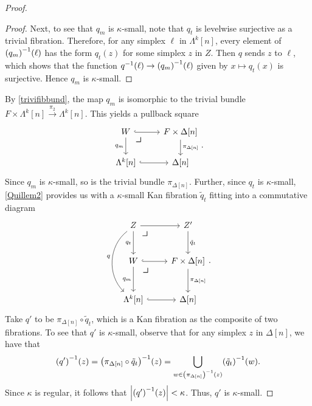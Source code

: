 \documentclass[10pt,letterpaper,cm]{nupset}
\theoremstyle{definition}
\theoremstyle{theorem}
\theoremstyle{remark}
\newcommand{\0}{\mathbf{0}}
\newcommand{\1}{\mathbf{1}}
\newcommand{\2}{\mathbf{2}}
\begin{document}
\begin{proof}
\begin{proof}
\medskip

Next, to see that $q_m$ is $\kappa$-small, note that $q_t$ is levelwise surjective as a trivial fibration. Therefore, for any simplex $\ell$ in $\Lambda^k[n]$, every element of $\mleft(q_m\mright)^{-1}(\ell)$ has the form $q_t(z)$ for some simplex $z$ in $Z$. Then $q$ sends $z$ to $\ell$, which shows that the function $q^{-1}(\ell) \to   \mleft(q_m\mright)^{-1}(\ell)$ given by $x\mapsto q_t(x)$ is surjective. Hence $q_m$ is $\kappa$-small.
\end{proof}
By \cref{trivifibbund}, the map $q_m$ is isomorphic to the trivial bundle $F \times \Lambda^k[n] \overset{\pi_2}{\longrightarrow} \Lambda^k[n]$. This yields a pullback square
\[
\begin{tikzcd}
W \arrow[d, "q_m"'] \arrow[r, hook] 
\arrow[dr, phantom, "\scalebox{1.5}{\color{black}$\lrcorner$}" , very near start, color=black]
& {F\times \Delta[n]} \arrow[d, "\pi_{\Delta[n]}"] \\
{\Lambda^k[n]} \arrow[r, hook]         & {\Delta[n]}                           
\end{tikzcd}
.\] Since $q_m$ is $\kappa$-small, so is the trivial bundle $\pi_{\Delta[n]}$. Further, since $q_t$ is $\kappa$-small,  \cref{Quillem2} provides us with  a $\kappa$-small Kan fibration $\tilde{q}_t$ fitting into a commutative diagram
\[
\begin{tikzcd}[row sep=large]
Z \arrow[d, "q_t"'] \arrow[r] \arrow[dd, "q"', bend right=49] 
\arrow[dr, phantom, "\scalebox{1.5}{\color{black}$\lrcorner$}" , very near start, color=black]
& Z' \arrow[d, "\tilde{q}_t"]            \\
W \arrow[d, "q_m"'] \arrow[r, hook]              
\arrow[dr, phantom, "\scalebox{1.5}{\color{black}$\lrcorner$}" , very near start, color=black]
             & {F\times \Delta[n]} \arrow[d, "\pi_{\Delta[n]}"] \\
{\Lambda^k[n]} \arrow[r, hook]                                & {\Delta[n]}                           
\end{tikzcd}
.\]
Take $q'$ to be $\pi_{\Delta[n]} \circ \tilde{q}_t$, which is a Kan fibration as the composite of two fibrations. To see that $q'$ is $\kappa$-small, observe that for any simplex $z$ in $\Delta[n]$, we have that
\[
\mleft(q^{\prime}\mright)^{-1}\mleft(z\mright)=\mleft(\pi_{\Delta[n]} \circ \tilde{q}_t\mright)^{-1}\mleft(z\mright)=\bigcup_{w \in\mleft(\pi_{\Delta[n]}\mright)^{-1}\mleft(z\mright)}\mleft(\tilde{q}_{t}\mright)^{-1}\mleft(w\mright)
.\] Since $\kappa$ is regular, it follows that $\mleft\lvert{\mleft(q^{\prime}\mright)^{-1}\mleft(z\mright)}\mright\rvert < \kappa$. Thus, $q'$ is $\kappa$-small.


\end{proof}
\end{document}
